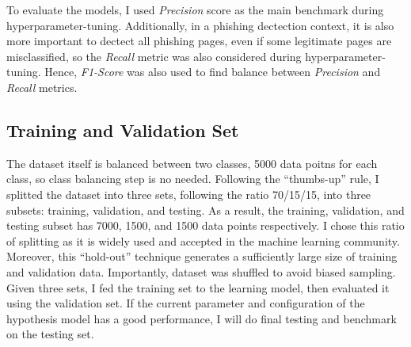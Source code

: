 To evaluate the models, I used \emph{Precision} score as the main benchmark during hyperparameter-tuning.
Additionally, in a phishing dectection context, it is also more important to dectect all
phishing pages, even if some legitimate pages are misclassified, so the \emph{Recall} metric was also
considered during hyperparameter-tuning. Hence, \emph{F1-Score } was also used to find balance
between \emph{Precision} and \emph{Recall} metrics.

\subsection{Training and Validation Set}
The dataset itself is balanced between two classes, 5000 data poitns for each class, so class balancing step
is no needed. Following the ``thumbs-up'' rule, I splitted the dataset into three sets, following the ratio 70/15/15,
into three subsets: training, validation, and testing. As a result, the training, validation, and testing subset
has 7000, 1500, and 1500 data points respectively. I chose this ratio of splitting as it is widely used and accepted
in the machine learning community. Moreover, this ``hold-out'' technique generates a sufficiently large size of
training and validation data. Importantly, dataset was shuffled to avoid biased sampling. Given three sets, I
fed the training set to the learning model, then evaluated it using the validation set. If the current parameter
and configuration of the hypothesis model has a good performance, I will do final testing and benchmark on the
testing set.